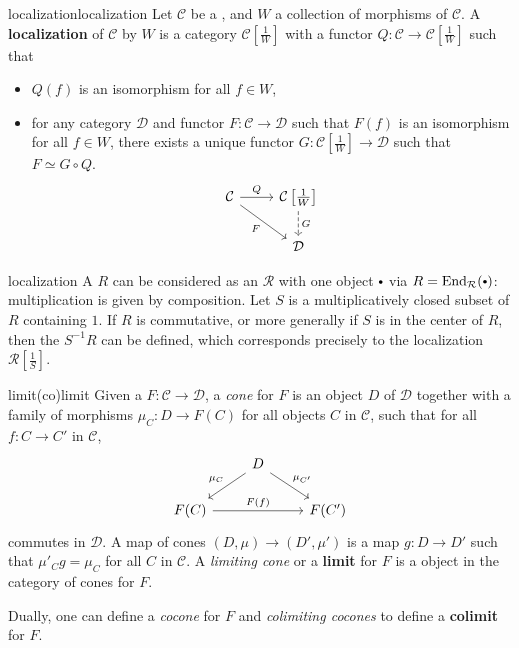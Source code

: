 \begin{topic}{localization}{localization}
    Let $\mathcal{C}$ be a , and $W$ a collection of morphisms of $\mathcal{C}$. A \textbf{localization} of $\mathcal{C}$ by $W$ is a category $\mathcal{C}\left[\frac{1}{W}\right]$ with a functor $Q : \mathcal{C} \to \mathcal{C}\left[\frac{1}{W}\right]$ such that
    \begin{itemize}
        \item $Q(f)$ is an isomorphism for all $f \in W$,
        \item for any category $\mathcal{D}$ and functor $F : \mathcal{C} \to \mathcal{D}$ such that $F(f)$ is an isomorphism for all $f \in W$, there exists a unique functor $G : \mathcal{C}\left[\frac{1}{W}\right] \to \mathcal{D}$ such that $F \simeq G \circ Q$.
        \[ \begin{tikzcd} \mathcal{C} \arrow{r}{Q} \arrow[swap]{rd}{F} & \mathcal{C}\left[\frac{1}{W}\right] \arrow[dashed]{d}{G} \\ & \mathcal{D} \end{tikzcd} \]
    \end{itemize}
\end{topic}

\begin{example}{localization}
    A  $R$ can be considered as an  $\mathcal{R}$ with one object $\bdot$ via $R = \text{End}_\mathcal{R}(\bdot)$: multiplication is given by composition. Let $S$ is a multiplicatively closed subset of $R$ containing $1$. If $R$ is commutative, or more generally if $S$ is in the center of $R$, then the  $S^{-1} R$ can be defined, which corresponds precisely to the localization $\mathcal{R}\left[\frac{1}{S}\right]$.
\end{example}

\begin{topic}{limit}{(co)limit}
    Given a  $F : \mathcal{C} \to \mathcal{D}$, a \textit{cone} for $F$ is an object $D$ of $\mathcal{D}$ together with a family of morphisms $\mu_C : D \to F(C)$ for all objects $C$ in $\mathcal{C}$, such that for all $f : C \to C'$ in $\mathcal{C}$,
    \[ \begin{tikzcd} & D \arrow[swap]{ld}{\mu_C} \arrow{rd}{\mu_{C'}} & \\ F(C) \arrow{rr}{F(f)} && F(C') \end{tikzcd} \]
    commutes in $\mathcal{D}$. A map of cones $(D, \mu) \to (D', \mu')$ is a map $g : D \to D'$ such that $\mu'_C g = \mu_C$ for all $C$ in $\mathcal{C}$. A \textit{limiting cone} or a \textbf{limit} for $F$ is a  object in the category of cones for $F$.
    
    Dually, one can define a \textit{cocone} for $F$ and \textit{colimiting cocones} to define a \textbf{colimit} for $F$.
\end{topic}

